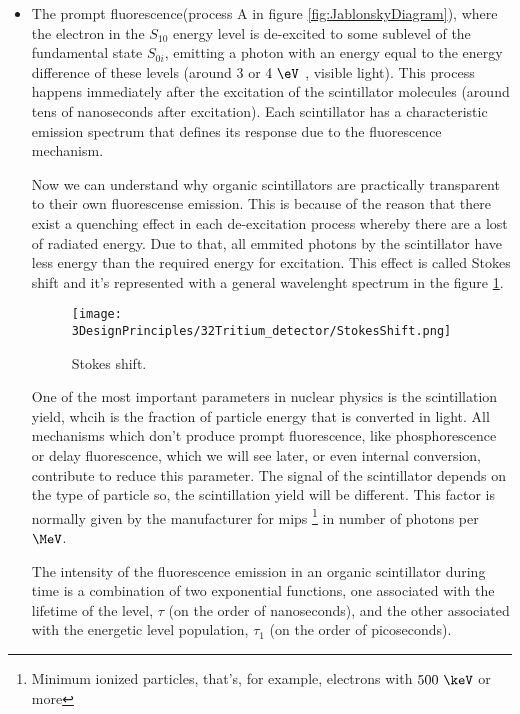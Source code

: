 \begin{itemize}

\item{} The prompt fluorescence(process A in figure \ref{fig:JablonskyDiagram}), where the electron in the $S_{10}$ energy level  is de-excited to some sublevel of the fundamental state $S_{0i}$, emitting a photon with an energy equal to the energy difference of these levels (around $3$ or $4~\eV$ , visible light). This process happens immediately after the excitation of the scintillator molecules (around tens of nanoseconds after excitation). Each scintillator has a characteristic emission spectrum that defines its response due to the fluorescence mechanism. 

Now we can understand why organic scintillators are practically transparent to their own fluorescense emission. This is because of the reason that there exist a quenching effect in each de-excitation process whereby there are a lost of radiated energy. Due to that, all emmited  photons by the scintillator have less energy than the required energy for excitation. This effect is called Stokes shift and it's represented with a general wavelenght spectrum in the figure \ref{fig:StokesShift}.

\begin{figure}[htbp]
\centering
\texttt{[image: 3DesignPrinciples/32Tritium\_detector/StokesShift.png]}
\caption{Stokes shift.\label{fig:StokesShift}~\cite{Knoll}}
\end{figure}

One of the most important parameters in nuclear physics is the scintillation yield, whcih is the fraction of particle energy that is converted in light. All mechanisms which don't produce prompt fluorescence, like phosphorescence or delay fluorescence, which we will see later, or even internal conversion, contribute to reduce this parameter. The signal of the scintillator depends on the type of particle so, the scintillation yield will be different. This factor is normally given by the manufacturer for mips \footnote{Minimum ionized particles, that's, for example, electrons with $500~\keV$ or more} in number of photons per $\MeV$.

The intensity of the fluorescence emission in an organic scintillator during time is a combination of two exponential functions, one associated with the lifetime of the level, $\tau$ (on the order of nanoseconds), and the other associated with the energetic level population, $\tau_1$ (on the order of picoseconds).


\end{itemize}

